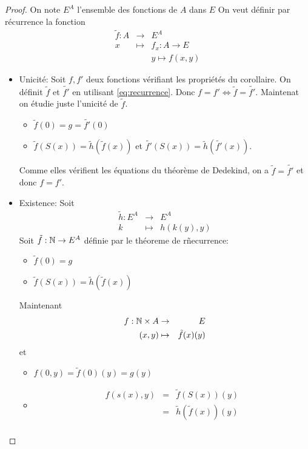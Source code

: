 \begin{proof}
	On note $E^A$ l'ensemble des fonctions de $A$ dans $E$
	On veut définir par récurrence la fonction
	\begin{eqnarray} \label{eq:recurrence}
		\tilde{f} : A & \to     & E^A   \\
		x             & \mapsto & f_x : A \to E    \nonumber \\
		&         & y \mapsto f(x,y) \nonumber
	\end{eqnarray}
	\begin{itemize}
		\item Unicité: Soit $f,f'$ deux fonctions vérifiant les propriétés du corollaire. On définit $\tilde{f}$ et $\tilde{f'}$ en utilisant \ref{eq:recurrence}.
		      Donc $f = f' \iff \tilde{f} = \tilde{f'}$.
		      Maintenat on étudie juste l'unicité de $\tilde{f}$.
		      \begin{itemize}
			      \item  $ \tilde{f}(0) = g = \tilde{f'}(0)$
			      \item $ \tilde{f}(S(x)) = \tilde{h}(\tilde{f}(x))$ et $ \tilde{f'}(S(x)) = \tilde{h}(\tilde{f'}(x))$.
		      \end{itemize}
		      Comme elles vérifient les équations du théorème de Dedekind, on a $\tilde{f} = \tilde{f'}$ et donc $f = f'$.
		\item Existence: Soit \begin{eqnarray*}
			      \tilde{h}: E^A & \to & E^A \\
			      k & \mapsto & h(k(y),y)
		      \end{eqnarray*}
		      Soit $\tilde{f} : \mathbb{N} \to E^A$ définie par le théoreme de rñecurrence:
		      \begin{itemize}
			      \item $\tilde{f}(0) = g$
			      \item $\tilde{f}(S(x)) = \tilde{h}(\tilde{f}(x))$
		      \end{itemize}
		      Maintenant \begin{eqnarray*}
			      f : \mathbb{N} \times A & \to & E \\
			      (x,y) & \mapsto & \tilde{f}(x)(y)
		      \end{eqnarray*}
		      et \begin{itemize}
			      \item $f(0,y) = \tilde{f}(0)(y) = g(y)$
			      \item \begin{eqnarray*}
				            f(s(x),y) & = & \tilde{f}(S(x))(y) \\
				            & = & \tilde{h}(\tilde{f}(x))(y) \\
			            \end{eqnarray*}
		      \end{itemize}
	\end{itemize}
\end{proof}


